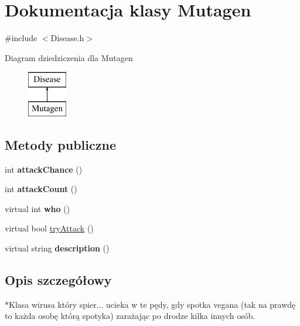 \hypertarget{classMutagen}{}\section{Dokumentacja klasy Mutagen}
\label{classMutagen}


{\ttfamily \#include $<$Disease.\+h$>$}

Diagram dziedziczenia dla Mutagen\begin{figure}[H]
\begin{center}
\leavevmode
\includegraphics[height=2.000000cm]{classMutagen}
\end{center}
\end{figure}
\subsection*{Metody publiczne}
\begin{DoxyCompactItemize}
\item 
int {\bfseries attack\+Chance} ()\hypertarget{classMutagen_afcd518c374fa5802575bcc5b4e7b98cd}{}\label{classMutagen_afcd518c374fa5802575bcc5b4e7b98cd}

\item 
int {\bfseries attack\+Count} ()\hypertarget{classMutagen_a2049d82c471219087055da1bc4bb6f71}{}\label{classMutagen_a2049d82c471219087055da1bc4bb6f71}

\item 
virtual int {\bfseries who} ()\hypertarget{classMutagen_a620c593682e56b1a0039f8f1aeea4f39}{}\label{classMutagen_a620c593682e56b1a0039f8f1aeea4f39}

\item 
virtual bool \hyperlink{classMutagen_a6c495ef43212c37e125b771d8d02898c}{try\+Attack} ()
\item 
virtual string {\bfseries description} ()\hypertarget{classMutagen_a47ac6ab84065448d49954c57fb555a3e}{}\label{classMutagen_a47ac6ab84065448d49954c57fb555a3e}

\end{DoxyCompactItemize}


\subsection{Opis szczegółowy}
$\ast$\+Klasa wirusa który spier... ucieka w te pędy, gdy spotka vegana (tak na prawdę to każda osobę którą spotyka) zarażając po drodze kilka innych osób. 

